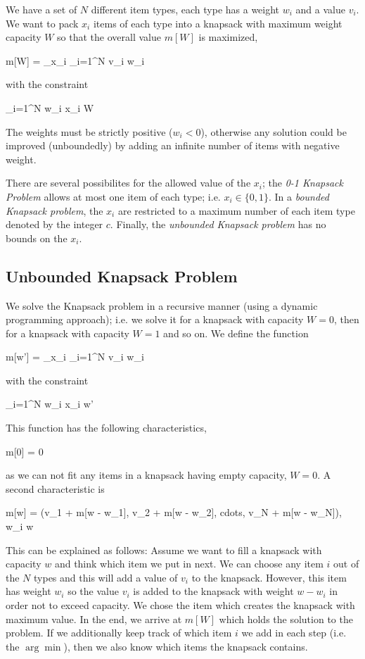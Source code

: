 
We have a set of $N$ different item types, each type has a weight $w_i$ and a value $v_i$. We want to pack $x_i$ items of each type into a knapsack with maximum weight capacity $W$ so that the overall value $m[W]$ is maximized,

\bee
m[W] = \max_{x_i} \sum_{i=1}^N v_i w_i
\eee

with the constraint

\bee
\sum_{i=1}^N w_i x_i \leq W
\eee

The weights must be strictly positive ($w_i < 0$), otherwise any solution could be improved (unboundedly) by adding an infinite number of items with negative weight.

There are several possibilites for the allowed value of the $x_i$; the \emph{0-1 Knapsack Problem} allows at most one item of each type; i.e. $x_i \in \{0,1\}$. In a \emph{bounded Knapsack problem}, the $x_i$ are restricted to a maximum number of each item type denoted by the integer $c$. Finally, the \emph{unbounded Knapsack problem} has no bounds on the $x_i$.


\subsection{Unbounded Knapsack Problem}

We solve the Knapsack problem in a recursive manner (using a dynamic programming approach); i.e. we solve it for a knapsack with capacity $W = 0$, then for a knapsack with capacity $W=1$ and so on. We define the function

\bee
m[w'] = \max_{x_i} \sum_{i=1}^N v_i w_i
\eee

with the constraint 

\bee
\sum_{i=1}^N w_i x_i \leq w'
\eee

This function has the following characteristics,

\bee
m[0] = 0
\eee

as we can not fit any items in a knapsack having empty capacity, $W = 0$. A second characteristic is

\bee
m[w] = \max(v_1 + m[w - w_1], v_2 + m[w - w_2], cdots, v_N + m[w - w_N]), \quad w_i \leq w
\eee

This can be explained as follows: Assume we want to fill a knapsack with capacity $w$ and think which item we put in next. We can choose any item $i$ out of the $N$ types and this will add a value of $v_i$ to the knapsack. However, this item has weight $w_i$ so the value $v_i$ is added to the knapsack with weight $w - w_i$ in order not to exceed capacity. We chose the item which creates the knapsack with maximum value. In the end, we arrive at $m[W]$ which holds the solution to the problem. If we additionally keep track of which item $i$ we add in each step (i.e. the $\arg \min$), then we also know which items the knapsack contains.

